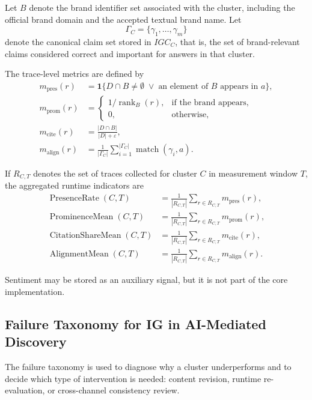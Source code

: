 \documentclass{article}
\begin{document}
Let \(B\) denote the brand identifier set associated with the cluster, including the official brand domain and the accepted textual brand name. Let
\[
\Gamma_C=\{\gamma_1,\dots,\gamma_m\}
\]
denote the canonical claim set stored in \(IGC_C\), that is, the set of brand-relevant claims considered correct and important for answers in that cluster.

The trace-level metrics are defined by
\begin{align}
m_{\text{pres}}(r)
&=
\mathbf{1}\{D \cap B \neq \emptyset \;\lor\; \text{an element of } B \text{ appears in } a\},\\[4pt]
m_{\text{prom}}(r)
&=
\begin{cases}
1/\operatorname{rank}_B(r), & \text{if the brand appears},\\
0, & \text{otherwise},
\end{cases}\\[4pt]
m_{\text{cite}}(r)
&=
\frac{|D \cap B|}{|D|+\varepsilon},\\[4pt]
m_{\text{align}}(r)
&=
\frac{1}{|\Gamma_C|}
\sum_{i=1}^{|\Gamma_C|}
\operatorname{match}(\gamma_i,a).
\end{align}

If \(R_{C,T}\) denotes the set of traces collected for cluster \(C\) in measurement window \(T\), the aggregated runtime indicators are
\begin{align}
\operatorname{PresenceRate}(C,T)
&=
\frac{1}{|R_{C,T}|}\sum_{r\in R_{C,T}} m_{\text{pres}}(r),\\[4pt]
\operatorname{ProminenceMean}(C,T)
&=
\frac{1}{|R_{C,T}|}\sum_{r\in R_{C,T}} m_{\text{prom}}(r),\\[4pt]
\operatorname{CitationShareMean}(C,T)
&=
\frac{1}{|R_{C,T}|}\sum_{r\in R_{C,T}} m_{\text{cite}}(r),\\[4pt]
\operatorname{AlignmentMean}(C,T)
&=
\frac{1}{|R_{C,T}|}\sum_{r\in R_{C,T}} m_{\text{align}}(r).
\end{align}

Sentiment may be stored as an auxiliary signal, but it is not part of the core implementation.

\subsection{Failure Taxonomy for IG in AI-Mediated Discovery}

The failure taxonomy is used to diagnose why a cluster underperforms and to decide which type of intervention is needed: content revision, runtime re-evaluation, or cross-channel consistency review.
\end{document}
